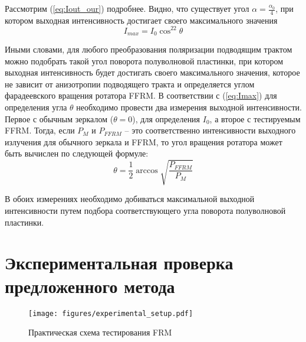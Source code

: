 \documentclass{article}
\begin{document}
Рассмотрим (\ref{eq:Iout_our}) подробнее.
Видно, что существует угол $\alpha = \frac{\alpha_0}{4}$, при котором выходная интенсивность достигает своего максимального значения
\begin{equation}
	\label{eq:Imax}
	I_{max} = I_0\cos^22\theta
\end{equation}

Иными словами, для любого преобразования поляризации подводящим трактом можно подобрать такой угол поворота полуволновой пластинки, при котором выходная интенсивность будет достигать своего максимального значения, которое не зависит от анизотропии подводящего тракта и определяется углом фарадеевского вращения ротатора FFRM.
В соответствии с (\ref{eq:Imax}) для определения угла $\theta$ необходимо провести два измерения выходной интенсивности.
Первое с обычным зеркалом ($\theta=0$), для определения $I_0$, а второе с тестируемым FFRM.
Тогда, если $P_M$ и $P_{FFRM}$ – это соответственно интенсивности выходного излучения для обычного зеркала и FFRM, то угол вращения ротатора может быть вычислен по следующей формуле:
\begin{equation}
	\label{eq:theta}
	\theta=\frac{1}{2}\arccos\sqrt{\frac{P_{FFRM}}{P_M}}
\end{equation}

В обоих измерениях необходимо добиваться максимальной выходной интенсивности путем подбора соответствующего угла поворота полуволновой пластинки.

\section{Экспериментальная проверка предложенного метода}
\begin{figure}[b]
	\centering
	\texttt{[image: figures/experimental\_setup.pdf]}
	\caption{Практическая схема тестирования FRM}
	\label{fig:experimantalScheme}
\end{figure}
\end{document}
